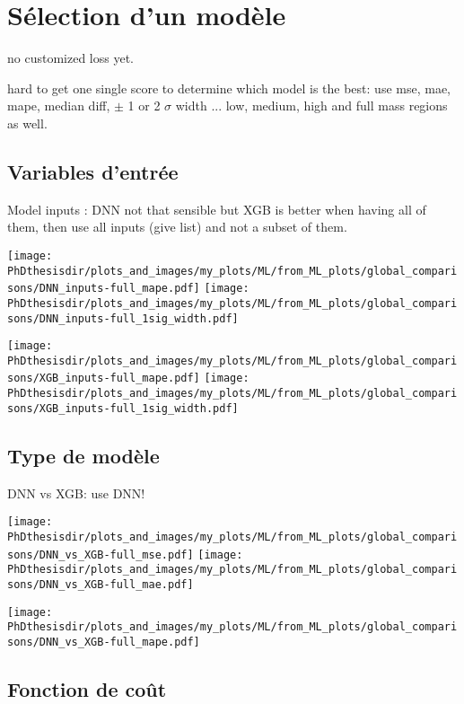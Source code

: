 \section{Sélection d'un modèle}\label{chapter-ML-section-hyperparameters}

no customized loss yet.

hard to get one single score to determine which model is the best: use mse, mae, mape, median diff, $\pm$ 1 or 2 $\sigma$ width ... low, medium, high and full mass regions as well.


\subsection{Variables d'entrée}

Model inputs : DNN not that sensible but XGB is better when having all of them, then use all inputs (give list) and not a subset of them.


\texttt{[image: \\PhDthesisdir/plots\_and\_images/my\_plots/ML/from\_ML\_plots/global\_comparisons/DNN\_inputs-full\_mape.pdf]}
\texttt{[image: \\PhDthesisdir/plots\_and\_images/my\_plots/ML/from\_ML\_plots/global\_comparisons/DNN\_inputs-full\_1sig\_width.pdf]}

\texttt{[image: \\PhDthesisdir/plots\_and\_images/my\_plots/ML/from\_ML\_plots/global\_comparisons/XGB\_inputs-full\_mape.pdf]}
\texttt{[image: \\PhDthesisdir/plots\_and\_images/my\_plots/ML/from\_ML\_plots/global\_comparisons/XGB\_inputs-full\_1sig\_width.pdf]}


\subsection{Type de modèle}

DNN vs XGB: use DNN!


\texttt{[image: \\PhDthesisdir/plots\_and\_images/my\_plots/ML/from\_ML\_plots/global\_comparisons/DNN\_vs\_XGB-full\_mse.pdf]}
\texttt{[image: \\PhDthesisdir/plots\_and\_images/my\_plots/ML/from\_ML\_plots/global\_comparisons/DNN\_vs\_XGB-full\_mae.pdf]}

\texttt{[image: \\PhDthesisdir/plots\_and\_images/my\_plots/ML/from\_ML\_plots/global\_comparisons/DNN\_vs\_XGB-full\_mape.pdf]}

\subsection{Fonction de coût}

